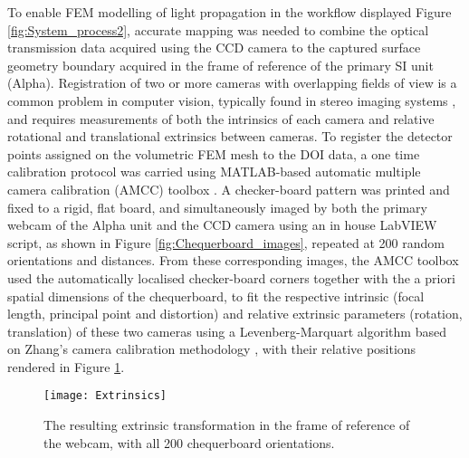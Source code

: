 \documentclass[twoside]{bhamthesis}
\theoremstyle{definition}
\begin{document}
To enable FEM modelling of light propagation in the workflow displayed Figure \ref{fig:System_process2}, accurate mapping was needed to combine the optical transmission data acquired using the CCD camera to the captured surface geometry boundary acquired in the frame of reference of the primary SI unit (Alpha). Registration of two or more cameras with overlapping fields of view is a common problem in computer vision, typically found in stereo imaging systems \cite{caprile1990using}, and requires measurements of both the intrinsics of each camera and relative rotational and translational extrinsics between cameras. To register the detector points assigned on the volumetric FEM mesh to the DOI data, a one time calibration protocol was carried using MATLAB-based automatic multiple camera calibration (AMCC) toolbox \cite{Warren2013}. A checker-board pattern was printed and fixed to a rigid, flat board, and simultaneously imaged by
both the primary webcam of the Alpha unit and the CCD camera using an in house LabVIEW script, as shown in Figure \ref{fig:Chequerboard_images}, repeated at 200 random orientations and distances. From these corresponding images, the AMCC toolbox used the automatically localised checker-board corners together with the a priori spatial dimensions of the chequerboard, to fit the respective intrinsic (focal length, principal point and distortion) and relative extrinsic parameters (rotation, translation) of these two cameras using a Levenberg-Marquart algorithm based on Zhang's camera calibration methodology \cite{zhang2000flexible}, with their relative positions rendered in Figure \ref{fig:Extrinsics}.

\begin{figure}[!ht]
\texttt{[image: Extrinsics]}
\centering
\caption{The resulting extrinsic transformation in the frame of reference of the webcam, with all 200 chequerboard orientations.}
\centering
\label{fig:Extrinsics}
\end{figure}
\end{document}
